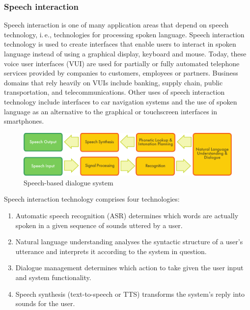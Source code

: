 \begin{multicols}{2}
\subsubsection{Speech interaction}

Speech interaction is one of many application areas that depend on speech technology, i.\,e., technologies for processing spoken language. Speech interaction technology is used to create interfaces that enable users to interact in spoken language instead of using a graphical display, keyboard and mouse. Today, these voice user interfaces (VUI) are used for partially or fully automated telephone services provided by companies to customers, employees or partners. Business domains that rely heavily on VUIs include banking, supply chain, public transportation, and telecommunications. Other uses of speech interaction technology include interfaces to car navigation systems and the use of spoken language as an alternative to the graphical or touchscreen interfaces in smartphones.

\begin{figure}[htb]
  \center
  \includegraphics[width=\textwidth]{../_media/english/simple_speech-based_dialogue_architecture}
  \caption{Speech-based dialogue system}
  \label{fig:dialoguearch_en}
\end{figure}

Speech interaction technology comprises four technologies: 

\begin{enumerate}
      \item Automatic speech recognition (ASR) determines which words are actually spoken in a given sequence of sounds uttered by a user.
      \item Natural language understanding analyses the syntactic structure of a user's utterance and interprets it according to the system in question.
      \item Dialogue management determines which action to take given the user input and system functionality.    
      \item Speech synthesis (text-to-speech or TTS) transforms the system's reply into sounds for the user.
    \end{enumerate}


\end{multicols}
